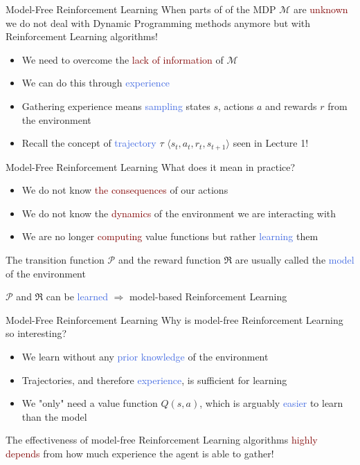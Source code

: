 \documentclass{beamer}
\begin{document}
\begin{frame}{Model-Free Reinforcement Learning}
	When parts of of the MDP $\mathcal{M}$ are \textcolor{Maroon}{unknown} we do not deal with Dynamic Programming methods anymore but with Reinforcement Learning algorithms!
	\begin{itemize}
		\item We need to overcome the \textcolor{Maroon}{lack of information} of $\mathcal{M}$
		\item We can do this through \textcolor{RoyalBlue}{experience}
		\item Gathering experience means \textcolor{RoyalBlue}{sampling} states $s$, actions $a$ and rewards $r$ from the environment
		\item Recall the concept of \textcolor{RoyalBlue}{trajectory} $\tau$ $\langle s_t,a_t,r_t,s_{t+1} \rangle$ seen in Lecture 1! 
	\end{itemize}
\end{frame}


\begin{frame}{Model-Free Reinforcement Learning}
	What does it mean in practice?
	\begin{itemize}
		\item We do not know \textcolor{Maroon}{the consequences} of our actions
		\item We do not know the \textcolor{Maroon}{dynamics} of the environment we are interacting with
		\item We are no longer \textcolor{Maroon}{computing} value functions but rather \textcolor{RoyalBlue}{learning} them
	\end{itemize}

	\bigskip

	The transition function $\mathcal{P}$ and the reward function $\Re$ are usually called the \textcolor{RoyalBlue}{model} of the environment
	
	\bigskip
	
	$\mathcal{P}$ and $\Re$ can be \textcolor{RoyalBlue}{learned} $\Rightarrow$ model-based Reinforcement Learning

\end{frame}


\begin{frame}{Model-Free Reinforcement Learning}
	Why is model-free Reinforcement Learning so interesting?
	\begin{itemize}
		\item We learn without any \textcolor{RoyalBlue}{prior knowledge} of the environment
		\item Trajectories, and therefore \textcolor{RoyalBlue}{experience}, is sufficient for learning
		\item We "only" need a value function $Q(s,a)$, which is arguably \textcolor{RoyalBlue}{easier} to learn than the model
	\end{itemize}

	\bigskip

	The effectiveness of model-free Reinforcement Learning algorithms \textcolor{Maroon}{highly depends} from how much experience the agent is able to gather!

\end{frame}
\end{document}
